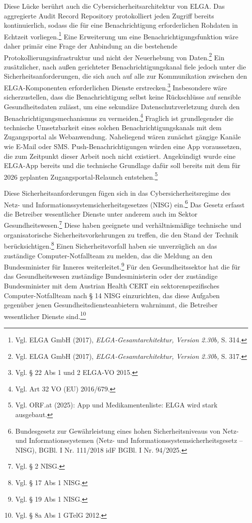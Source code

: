 Diese Lücke berührt auch die Cybersicherheitsarchitektur von ELGA. Das aggregierte Audit Record Repository protokolliert jeden Zugriff bereits kontinuierlich, sodass die für eine Benachrichtigung erforderlichen Rohdaten in Echtzeit vorliegen.\footnote{Vgl.  ELGA GmbH (2017), \textit{ELGA-Gesamtarchitektur, Version 2.30b,} S. 314.} Eine Erweiterung um eine Benachrichtigungsfunktion wäre daher primär eine Frage der Anbindung an die bestehende Protokollierungsinfrastruktur und nicht der Neuerhebung von Daten.\footnote{Vgl.  ELGA GmbH (2017), \textit{ELGA-Gesamtarchitektur, Version 2.30b,} S. 317.} Ein zusätzlicher, nach außen gerichteter Benachrichtigungskanal fiele jedoch unter die Sicherheitsanforderungen, die sich auch auf alle zur Kommunikation zwischen den ELGA-Komponenten erforderlichen Dienste erstrecken.\footnote{Vgl. § 22 Abs 1 und 2 ELGA-VO 2015.} Insbesondere wäre sicherzustellen, dass die Benachrichtigung selbst keine Rückschlüsse auf sensible Gesundheitsdaten zulässt, um eine sekundäre Datenschutzverletzung durch den Benachrichtigungsmechanismus zu vermeiden.\footnote{Vgl. Art 32 VO (EU) 2016/679.}
Fraglich ist grundlegender die technische Umsetzbarkeit eines solchen Benachrichtigungskanals mit dem Zugangsportal als Webanwendung. Naheliegend wären zunächst gängige Kanäle wie E-Mail oder SMS.
Push-Benachrichtigungen würden eine App voraussetzen, die zum Zeitpunkt dieser Arbeit noch nicht existiert. Angekündigt wurde eine ELGA-App bereits und die technische Grundlage dafür soll bereits mit dem für 2026 geplanten Zugangsportal-Relaunch entstehen.\footnote{Vgl. ORF.at (2025): App und
Medikamentenliste: ELGA wird stark ausgebaut.}

Diese Sicherheitsanforderungen fügen sich in das Cybersicherheitsregime des Netz- und Informationssystemsicherheitsgesetzes (NISG) ein.\footnote{Bundesgesetz zur Gewährleistung eines hohen Sicherheitsniveaus von Netz- und Informationssystemen
(Netz- und Informationssystemsicherheitsgesetz – NISG), BGBl. I Nr. 111/2018 idF BGBl. I Nr. 94/2025.} Das Gesetz erfasst die Betreiber wesentlicher Dienste unter anderem auch im Sektor Gesundheitswesen.\footnote{Vgl. § 2 NISG.} Diese haben geeignete und verhältnismäßige technische und organisatorische Sicherheitsvorkehrungen zu treffen, die den Stand der Technik berücksichtigen.\footnote{Vgl. § 17 Abs 1 NISG.} Einen Sicherheitsvorfall haben sie unverzüglich an das zuständige Computer-Notfallteam zu melden, das die Meldung an den Bundesminister für Inneres weiterleitet.\footnote{Vgl. § 19 Abs 1 NISG.} Für den Gesundheitssektor hat die für das Gesundheitswesen zuständige Bundesministerin oder der zuständige Bundesminister mit dem Austrian Health CERT ein sektorenspezifisches Computer-Notfallteam nach § 14 NISG einzurichten, das diese Aufgaben gegenüber jenen Gesundheitsdiensteanbietern wahrnimmt, die Betreiber wesentlicher Dienste sind.\footnote{Vgl. § 8a Abs 1 GTelG 2012.}


